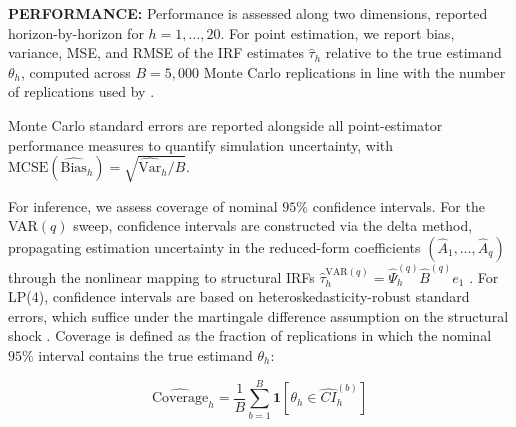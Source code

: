 

\textbf{PERFORMANCE:} Performance is assessed along two dimensions, reported 
horizon-by-horizon for $h = 1, \ldots, 20$. For point estimation, we report 
bias, variance, MSE, and RMSE of the IRF estimates $\hat{\tau}_h$ relative 
to the true estimand $\theta_h$, computed across $B = 5{,}000$ Monte Carlo 
replications in line with the number of replications used by 
\textcite{li2024local}.

Monte Carlo standard errors are reported alongside all point-estimator 
performance measures to quantify simulation uncertainty, with 
$\mathrm{MCSE}(\widehat{\mathrm{Bias}}_h) = \sqrt{\widehat{\mathrm{Var}}_h 
/ B}$.

For inference, we assess coverage of nominal $95\%$ confidence intervals. 
For the VAR$(q)$ sweep, confidence intervals are constructed via the delta 
method, propagating estimation uncertainty in the reduced-form coefficients 
$(\hat{A}_1, \ldots, \hat{A}_q)$ through the nonlinear mapping to structural 
IRFs $\hat{\tau}_h^{\mathrm{VAR}(q)} = \hat{\Psi}_h^{(q)} \hat{B}^{(q)} 
e_1$ \parencite{kilian2017structural}. For LP(4), confidence intervals are 
based on heteroskedasticity-robust standard errors, which suffice under the 
martingale difference assumption on the structural shock 
\parencite{plagborg2021local}. Coverage is defined as the fraction of 
replications in which the nominal $95\%$ interval contains the true estimand 
$\theta_h$:

\begin{equation}
    \widehat{\mathrm{Coverage}}_h = \frac{1}{B} \sum_{b=1}^{B} 
    \mathbf{1}\left[\theta_h \in \hat{CI}_h^{(b)}\right]
\end{equation}



